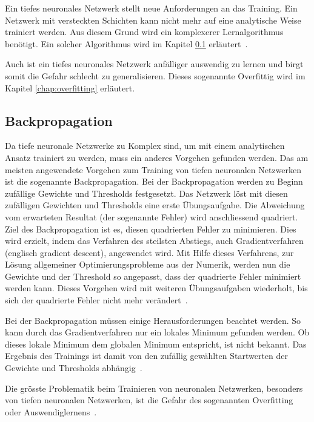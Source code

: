 Ein tiefes neuronales Netzwerk stellt neue Anforderungen an das Training. Ein Netzwerk mit versteckten Schichten kann nicht mehr auf eine analytische Weise trainiert werden. Aus diesem Grund wird ein komplexerer Lernalgorithmus benötigt. Ein solcher Algorithmus wird im Kapitel \ref{chap:backpropagation} erläutert~\autocite{Krogh2008}. 

Auch ist ein tiefes neuronales Netzwerk anfälliger auswendig zu lernen und birgt somit die Gefahr schlecht zu generalisieren. Dieses sogenannte Overfittig wird im Kapitel \ref{chap:overfitting} erläutert.

\subsection{Backpropagation}
\label{chap:backpropagation}

Da tiefe neuronale Netzwerke zu Komplex sind, um mit einem analytischen Ansatz trainiert zu werden, muss ein anderes Vorgehen gefunden werden. Das am meisten angewendete Vorgehen zum Training von tiefen neuronalen Netzwerken ist die sogenannte Backpropagation. Bei der Backpropagation werden zu Beginn zufällige Gewichte und Thresholds festgesetzt. Das Netzwerk löst mit diesen zufälligen Gewichten und Thresholds eine erste Übungsaufgabe. Die Abweichung vom erwarteten Resultat (der sogenannte Fehler) wird anschliessend quadriert. Ziel des Backpropagation ist es, diesen quadrierten Fehler zu minimieren. Dies wird erzielt, indem das Verfahren des steilsten Abstiegs, auch Gradientverfahren (englisch gradient descent), angewendet wird. Mit Hilfe dieses Verfahrens, zur Lösung allgemeiner Optimierungsprobleme aus der Numerik, werden nun die Gewichte und der Threshold so angepasst, dass der quadrierte Fehler minimiert werden kann. Dieses Vorgehen wird mit weiteren Übungsaufgaben wiederholt, bis sich der quadrierte Fehler nicht mehr verändert~\autocite{Krogh2008}.

Bei der Backpropagation müssen einige Herausforderungen beachtet werden. So kann durch das Gradientverfahren nur ein lokales Minimum gefunden werden. Ob dieses lokale Minimum dem globalen Minimum entspricht, ist nicht bekannt. Das Ergebnis des Trainings ist damit von den zufällig gewählten Startwerten der Gewichte und Thresholds abhängig~\autocite{Krogh2008}.

Die grösste Problematik beim Trainieren von neuronalen Netzwerken, besonders von tiefen neuronalen Netzwerken, ist die Gefahr des sogenannten Overfitting oder Auswendiglernens~\autocite{Krogh2008}.

